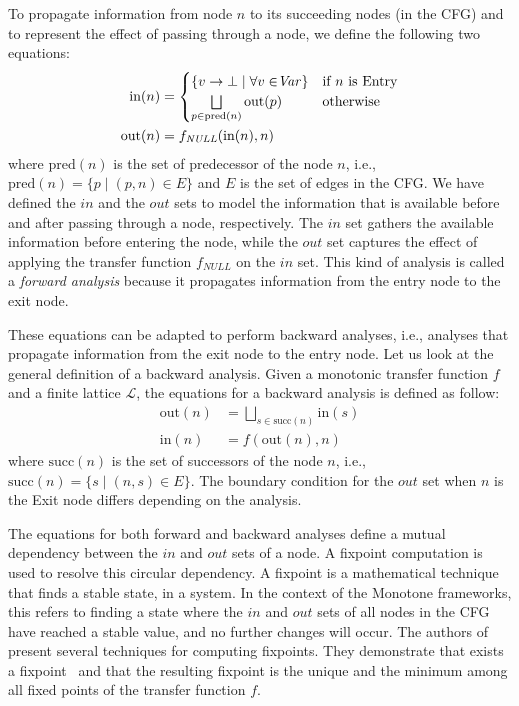 To propagate information from node $n$ to its succeeding nodes (in the CFG) and to represent the
effect of passing through a node, we define the following two equations:
\begin{align*}
  \text{in}(n) &= \begin{cases} \{ v \rightarrow \bot \mid \forall v \in $\textit{Var}$ \} & $if $ n $ is Entry$ \\ \bigsqcup\limits_{p \in \text{pred}(n)} \text{out}(p) & $otherwise$ \end{cases} \\
  \text{out}(n) &= f_{\text{\textit{NULL}}}(\text{in}(n),n)
\end{align*}
where $\text{pred}(n)$ is the set of predecessor of the node $n$, i.e., $\text{pred}(n) = \{ p \mid (p,n)\in E\}$ and $E$ is the set of edges in the CFG.
We have defined the $in$ and the $out$ sets to model the information that is available
before and after passing through a node, respectively. The $in$ set gathers the available
information before entering the node, while the $out$ set captures the effect
of applying the transfer function $f_{\textit{NULL}}$ on the $in$ set.
This kind of analysis is called a \emph{forward analysis} because it propagates information
from the entry node to the exit node.

These equations can be adapted to perform backward analyses, i.e., analyses that
propagate information from the exit node to the entry node. Let us look at the
general definition of a backward analysis.
Given a monotonic transfer function $f$ and a finite lattice $\mathcal{L}$, the equations for
a backward analysis is defined as follow:
\begin{align*}
  \text{out}(n) &= \bigsqcup\limits_{s \in \text{succ}(n)} \text{in}(s) \\
  \text{in}(n) &= f(\text{out}(n),n)
\end{align*}
where $\text{succ}(n)$ is the set of successors of the node $n$, i.e., $\text{succ}(n) = \{ s \mid (n,s)\in E\}$.
The boundary condition for the $\textit{out}$ set when $n$ is the Exit node differs depending on the
analysis.

The equations for both forward and backward analyses define a mutual dependency
between the $in$ and $out$ sets of a node.
A fixpoint computation is used to resolve this circular dependency. A fixpoint is
a mathematical technique that finds a stable state, in a system.
In the context of the Monotone frameworks, this
refers to finding a state where the $in$ and $out$ sets of all nodes in the CFG have reached a
stable value, and no further changes will occur. The authors of~\cite{Nielson2010Principles}
present several techniques for computing fixpoints. They demonstrate that exists a fixpoint~\cite{Knaster1929} and that the resulting
fixpoint is the unique and the minimum among all fixed points of the transfer function $f$.




